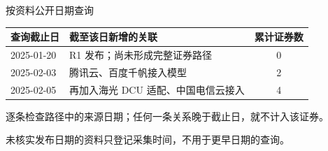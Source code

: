 \begin{frame}{按资料公开日期查询}\relax
{}
{\fontsize{11.7}{15}\selectfont
\begin{tabularx}{\linewidth}{@{}l X c@{}}
\toprule
查询截止日 & 截至该日新增的关联 & 累计证券数\\
\midrule
2025-01-20 & R1 发布；尚未形成完整证券路径 & 0\\
2025-02-03 & 腾讯云、百度千帆接入模型 & 2\\
2025-02-05 & 再加入海光 DCU 适配、中国电信云接入 & 4\\
\bottomrule
\end{tabularx}}
\Gap
{}
逐条检查路径中的来源日期；任何一条关系晚于截止日，就不计入该证券。\par
未核实发布日期的资料只登记采集时间，不用于更早日期的查询。
\end{frame}

